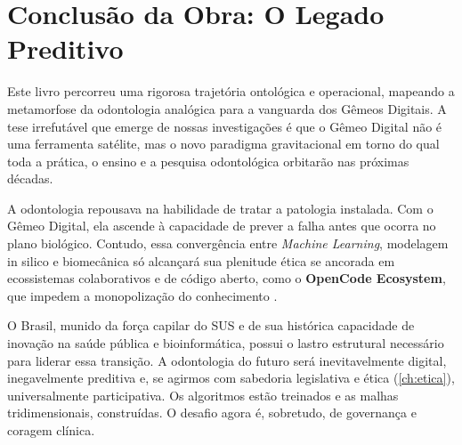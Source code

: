 \section{Conclusão da Obra: O Legado Preditivo}

Este livro percorreu uma rigorosa trajetória ontológica e operacional, mapeando a metamorfose da odontologia analógica para a vanguarda dos Gêmeos Digitais. A tese irrefutável que emerge de nossas investigações é que o Gêmeo Digital não é uma ferramenta satélite, mas o novo paradigma gravitacional em torno do qual toda a prática, o ensino e a pesquisa odontológica orbitarão nas próximas décadas.

A odontologia repousava na habilidade de tratar a patologia instalada. Com o Gêmeo Digital, ela ascende à capacidade de prever a falha antes que ocorra no plano biológico. Contudo, essa convergência entre \textit{Machine Learning}, modelagem in silico e biomecânica só alcançará sua plenitude ética se ancorada em ecossistemas colaborativos e de código aberto, como o \textbf{OpenCode Ecosystem}, que impedem a monopolização do conhecimento \cite{robles2023opentwins}. 

O Brasil, munido da força capilar do SUS e de sua histórica capacidade de inovação na saúde pública e bioinformática, possui o lastro estrutural necessário para liderar essa transição. A odontologia do futuro será inevitavelmente digital, inegavelmente preditiva e, se agirmos com sabedoria legislativa e ética (\autoref{ch:etica}), universalmente participativa. Os algoritmos estão treinados e as malhas tridimensionais, construídas. O desafio agora é, sobretudo, de governança e coragem clínica.
